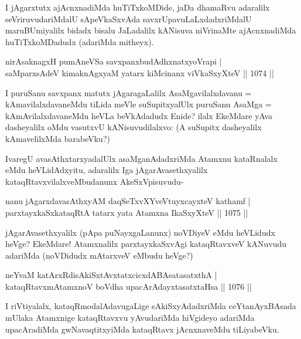 \begin{artha}
I jAgarxtutx ajAcnxnadiMda huTiTxkoMDide, jaDa dhamaRvu adaralilx seVriruvudariMdalU sApeVkaSxvAda savxrUpavuLaLxdadxriMdalU maruBUmiyalilx bidadx bisalu JaLadalilx kANisuva niVrinaMte ajAcnxnadiMda huTiTxkoMDadudx (adariMda mitheyx).
\end{artha}

\begin{shl}
nirAsaknagxH pumAneVSa savxpanxbudAdhxnatxyoVrapi | \\
saMparxsAdeV kimaknAgxyaM yatarx kiMcinanx viVkaSxyXteV \hfill||  1074 ||  
\end{shl}

\begin{artha}
I puruSanu savxpanx matutx jAgaragaLalilx AsaMgavilalxdavanu = kAmavilalxdavaneMdu tiLida meVle suSupitxyalUlx puruSanu AsaMga =  kAmAvilalxdavaneMdu heVLa beVkAdadudx Enide? ilalx EkeMdare yAva dasheyalilx oMdu vasutxvU kANisuvudilalxvo: (A suSupitx dasheyalilx kAmavelilxMda barabeVku?)
\end{artha}

\begin{artha}
IvaregU avasAthxtarxyadalUlx asaMganAdadxriMda Atamxnu kataRnalalx eMdu heVLidAdxyitu, adaralilx Iga jAgarAvasethxyalilx kataqRtavxvilalxveMbudanunx AkeSxVpisuvudu-
\end{artha}


\begin{shl}
nanu jAgarxdavasAthxyAM daqSeTxvXYveVtuyxcayxteV kathamf | \\
parxtayxkaSxkataqRtA tatarx yata Atamxna IkaSxyXteV \hfill||  1075 ||  
\end{shl}

\begin{artha}
jAgarAvasethxyalilx (pApa puNayxgaLanunx) noVDiyeV eMdu heVLidudx heVge? EkeMdare! Atamxnalilx parxtayxkaSxvAgi kataqRtavxveV kANuvudu adariMda (noVDidudx mAtarxveV eMbudu heVge?)
\end{artha}


\begin{shl}
neYvaM katArxRdisAkiSxtAvxtatxcicxdABAsatasatxthA | \\
kataqRtavxmAtamxnoV boVdha upacArAdayxtasatxtaHsa \hfill||  1076 ||  
\end{shl}

\begin{artha}
I riVtiyalalx, kataqRmodalAdavugaLige sAkiSxyAdadxriMda ceYtanAyxBAsada mUlaka Atamxnige kataqRtavxvu yAvudariMda hiVgideyo adariMda upacAradiMda gwNavaqtitxyiMda kataqRtavx jAcnxnaveMdu tiLiyabeVku.
\end{artha}

